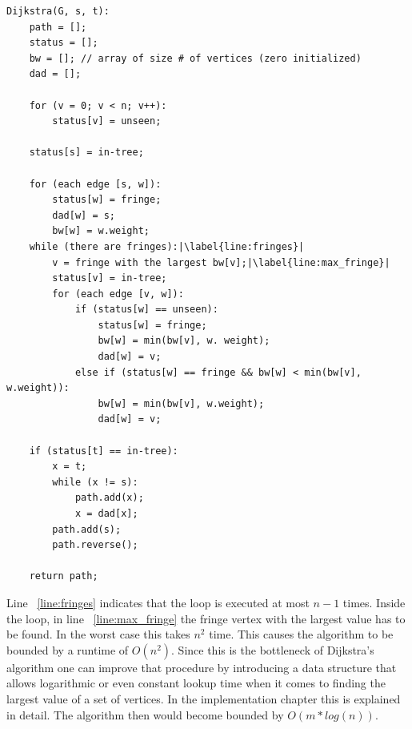 \documentclass{article}
\begin{document}
\begin{lstlisting}[escapechar=|]
Dijkstra(G, s, t):
	path = [];
	status = [];
	bw = []; // array of size # of vertices (zero initialized)
	dad = [];
	
	for (v = 0; v < n; v++):
		status[v] = unseen;
		
	status[s] = in-tree;
	
	for (each edge [s, w]):
		status[w] = fringe;
		dad[w] = s;
		bw[w] = w.weight;
	while (there are fringes):|\label{line:fringes}|
		v = fringe with the largest bw[v];|\label{line:max_fringe}|
		status[v] = in-tree;
		for (each edge [v, w]):
			if (status[w] == unseen):
				status[w] = fringe;
				bw[w] = min(bw[v], w. weight);
				dad[w] = v;
			else if (status[w] == fringe && bw[w] < min(bw[v], w.weight)):
				bw[w] = min(bw[v], w.weight);
				dad[w] = v;
				
	if (status[t] == in-tree):
		x = t;
		while (x != s):
			path.add(x);
			x = dad[x];
		path.add(s);
		path.reverse();
	
	return path;
\end{lstlisting}

Line ~\ref{line:fringes} indicates that the loop is executed at most $n-1$ times. Inside the loop, in line ~\ref{line:max_fringe} the fringe vertex with the largest value has to be found. In the worst case this takes $n^2$ time. This causes the algorithm to be bounded by a runtime of $O(n^2)$. Since this is the bottleneck of Dijkstra's algorithm one can improve that procedure by introducing a data structure that allows logarithmic or even constant lookup time when it comes to finding the largest value of a set of vertices. In the implementation chapter this is explained in detail. The algorithm then would become bounded by $O(m * log(n))$.
\end{document}

